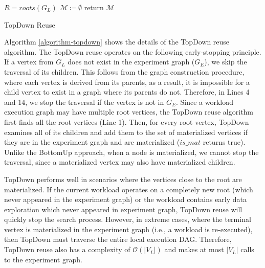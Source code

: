 \begin{algorithm}[h]
$R=roots(G_L)$\;
$\mathcal{M} \coloneqq \emptyset$\;
return $\mathcal{M}$\;
\caption{TopDown Reuse}\label{algorithm-topdown}
\end{algorithm}
Algorithm \ref{algorithm-topdown} shows the details of the TopDown reuse algorithm.
The TopDown reuse operates on the following early-stopping principle.
If a vertex from $G_L$ does not exist in the experiment graph ($G_E$), we skip the traversal of its children.
This follows from the graph construction procedure, where each vertex is derived from its parents, as a result, it is impossible for a child vertex to exist in a graph where its parents do not.
Therefore, in Lines 4 and 14, we stop the traversal if the vertex is not in $G_E$.
Since a workload execution graph may have multiple root vertices, the TopDown reuse algorithm first finds all the root vertices (Line 1).
Then, for every root vertex, TopDown examines all of its children and add them to the set of materialized vertices if they are in the experiment graph and are materialized ($is\_mat$ returns true).
Unlike the BottomUp approach, when a node is materialized, we cannot stop the traversal, since a materialized vertex may also have materialized children.

TopDown performs well in scenarios where the vertices close to the root are materialized.
If the current workload operates on a completely new root (which never appeared in the experiment graph) or the workload contains early data exploration which never appeared in experiment graph, TopDown reuse will quickly stop the search process.
However, in extreme cases, where the terminal vertex is materialized in the experiment graph (i.e., a workload is re-executed), then TopDown must traverse the entire local execution DAG.
Therefore, TopDown reuse also has a complexity of $\mathcal{O}(|V_L|)$ and makes at most $|V_L|$ calls to the experiment graph.

